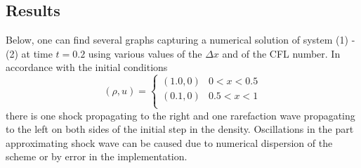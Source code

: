\documentclass[a4paper, 10pt]{article}
\begin{document}
\subsection{Results}
Below, one can find several graphs capturing a numerical solution of system (1) - (2) at time $ t = 0.2 $ using various values of the $ \Delta x $ and of the CFL number. In accordance with the initial conditions
\begin{equation}
\left(\rho, u\right) =
\left\{
\begin{array}{ll}
\left( 1.0, 0 \right)  & 0 < x < 0.5 \\
\left( 0.1, 0 \right)  & 0.5 < x < 1 \\
\end{array} 
\right.
\end{equation}
there is one shock propagating to the right and one rarefaction wave propagating to the left on both sides of the initial step in the density. Oscillations in the part approximating shock wave can be caused due to numerical dispersion of the scheme or by error in the implementation.
\end{document}
